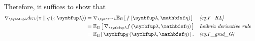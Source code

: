 \begin{proofEnd}
\begin{align}
  \end{align}
  Therefore, it suffices to show that
  \begin{align*}
    \nabla_{\vlambda} \DKL{\pi}{q\left(\cdot; \vlambda\right)}
    &=
    \nabla_{\vlambda} \Esub{\Pi}{ f\left(\vlambda, \rvveta\right) }
    &&\text{\textit{\cref{eq:F_KL}}}
    \\
    &=
    \Esub{\Pi}{ \nabla_{\vlambda}  f\left(\vlambda, \rvveta\right) }
    &&\text{\textit{{Leibniz derivative rule}}}
    \\
    &=
    \Esub{\Pi}{ \vg\left(\vlambda, \rvveta\right) }.
    &&\text{\textit{\cref{eq:F_grad_G}}}
  \end{align*}
\end{proofEnd}

